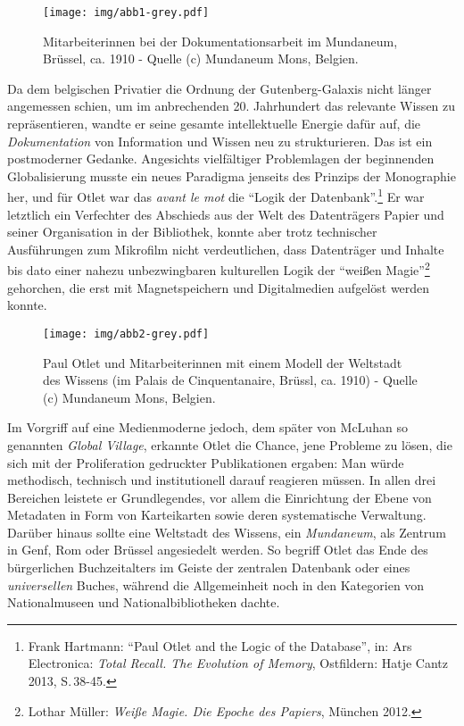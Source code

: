 \begin{figure}[htbp]
\centering
\texttt{[image: img/abb1-grey.pdf]}
\caption*{Mitarbeiterinnen bei der Dokumentationsarbeit im Mundaneum,
Brüssel, ca. 1910 - Quelle (c) Mundaneum Mons, Belgien.}
\end{figure}

Da dem belgischen Privatier die Ordnung der Gutenberg-Galaxis nicht
länger angemessen schien, um im anbrechenden 20. Jahrhundert das
relevante Wissen zu repräsentieren, wandte er seine gesamte
intellektuelle Energie dafür auf, die \emph{Dokumentation} von
Information und Wissen neu zu strukturieren. Das ist ein postmoderner
Gedanke. Angesichts vielfältiger Problemlagen der beginnenden
Globalisierung musste ein neues Paradigma jenseits des Prinzips der
Monographie her, und für Otlet war das \emph{avant le mot} die
\enquote{Logik der Datenbank}.\footnote{Frank Hartmann: \enquote{Paul
  Otlet and the Logic of the Database}, in: Ars Electronica: \emph{Total
  Recall. The Evolution of Memory}, Ostfildern: Hatje Cantz 2013, S.\,38-45.} 
Er war letztlich ein Verfechter des Abschieds aus der Welt des
Datenträgers Papier und seiner Organisation in der Bibliothek, konnte
aber trotz technischer Ausführungen zum Mikrofilm nicht verdeutlichen,
dass Datenträger und Inhalte bis dato einer nahezu unbezwingbaren
kulturellen Logik der \enquote{weißen Magie}\footnote{Lothar Müller:
  \emph{Weiße Magie. Die Epoche des Papiers}, München 2012.} gehorchen,
die erst mit Magnetspeichern und Digitalmedien aufgelöst werden konnte.

\begin{figure}[htbp]
\centering
\texttt{[image: img/abb2-grey.pdf]}
\caption*{Paul Otlet und Mitarbeiterinnen mit einem Modell der Weltstadt
des Wissens (im Palais de Cinquentanaire, Brüssl, ca. 1910) - Quelle (c)
Mundaneum Mons, Belgien.}
\end{figure}

Im Vorgriff auf eine Medienmoderne jedoch, dem später von McLuhan so
genannten \emph{Global Village}, erkannte Otlet die Chance, jene
Probleme zu lösen, die sich mit der Proliferation gedruckter
Publikationen ergaben: Man würde methodisch, technisch und
institutionell darauf reagieren müssen. In allen drei Bereichen leistete
er Grundlegendes, vor allem die Einrichtung der Ebene von Metadaten in
Form von Karteikarten sowie deren systematische Verwaltung. Darüber
hinaus sollte eine Weltstadt des Wissens, ein \emph{Mundaneum}, als
Zentrum in Genf, Rom oder Brüssel angesiedelt werden. So begriff Otlet
das Ende des bürgerlichen Buchzeitalters im Geiste der zentralen
Datenbank oder eines \emph{universellen} Buches, während die
Allgemeinheit noch in den Kategorien von Nationalmuseen und
Nationalbibliotheken dachte.

